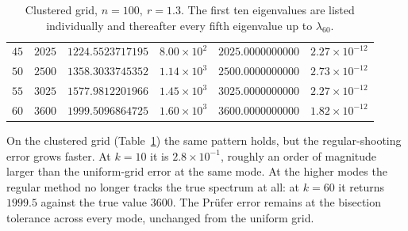 \documentclass[12pt,reqno]{amsart}
\numberwithin{equation}{section}
\begin{document}
\begin{table}[ht]
\begin{tabular}{rrrrrr}
$45$ & $2025$ & $1224.5523717195$ & $8.00\times 10^{2}$  & $2025.0000000000$ & $2.27\times 10^{-12}$ \\
$50$ & $2500$ & $1358.3033745352$ & $1.14\times 10^{3}$  & $2500.0000000000$ & $2.73\times 10^{-12}$ \\
$55$ & $3025$ & $1577.9812201966$ & $1.45\times 10^{3}$  & $3025.0000000000$ & $2.27\times 10^{-12}$ \\
$60$ & $3600$ & $1999.5096864725$ & $1.60\times 10^{3}$  & $3600.0000000000$ & $1.82\times 10^{-12}$ \\
\bottomrule
\end{tabular}
\caption{Clustered grid, $n = 100,~r=1.3$. The first ten eigenvalues are listed individually and thereafter every fifth eigenvalue up to $\lambda_{60}$.}
\label{tab:clustered}
\end{table}

On the clustered grid (Table~\ref{tab:clustered}) the same pattern holds, but the regular-shooting error grows faster. At $k=10$ it is $2.8\times 10^{-1}$, roughly an order of magnitude larger than the uniform-grid error at the same mode. At the higher modes the regular method no longer tracks the true spectrum at all: at $k=60$ it returns $1999.5$ against the true value $3600$. The Pr\"ufer error remains at the bisection tolerance across every mode, unchanged from the uniform grid.
\end{document}
